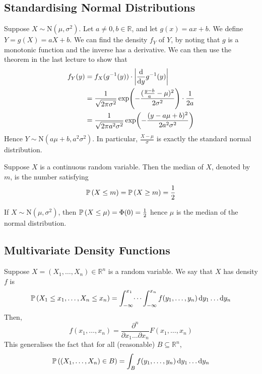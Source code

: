 \subsection{Standardising Normal Distributions}
Suppose \(X \sim \mathrm{N}(\mu, \sigma^2)\). Let \(a \neq 0, b \in \mathbb R\), and let \(g(x) = ax+b\). We define \(Y = g(X) = aX+b\). We can find the density \(f_Y\) of \(Y\), by noting that \(g\) is a monotonic function and the inverse has a derivative. We can then use the theorem in the last lecture to show that
\begin{align*}
	f_Y(y) & = f_X(g^{-1}(y)) \cdot \abs{\dv{y} g^{-1}(y)}                                                       \\
	       & = \frac{1}{\sqrt{2\pi\sigma^2}} \exp(-\frac{(\frac{y-b}{a} - \mu)^2}{2\sigma^2}) \cdot \frac{1}{2a} \\
	       & =\frac{1}{\sqrt{2\pi a^2\sigma^2}} \exp(-\frac{(y - a\mu + b)^2}{2 a^2 \sigma^2})
\end{align*}
Hence \(Y \sim \mathrm{N}(a \mu + b, a^2 \sigma^2)\). In particular, \(\frac{X-\mu}{\sigma}\) is exactly the standard normal distribution.
\begin{definition}
	Suppose \(X\) is a continuous random variable. Then the median of \(X\), denoted by \(m\), is the number satisfying
	\[ \mathbb{P}\left({X \leq m}\right) = \mathbb{P}\left({X \geq m}\right) = \frac{1}{2} \]
\end{definition}
\noindent If \(X \sim \mathrm{N}(\mu, \sigma^2)\), then \(\mathbb{P}\left({X \leq \mu}\right) = \Phi(0) = \frac{1}{2}\) hence \(\mu\) is the median of the normal distribution.

\subsection{Multivariate Density Functions}
Suppose \(X = (X_1, \dots, X_n) \in \mathbb R^n\) is a random variable. We say that \(X\) has density \(f\) is
\[ \mathbb{P}\left({X_1 \leq x_1, \dots, X_n \leq x_n}\right) = \int_{-\infty}^{x_1} \dots \int_{-\infty}^{x_n}  f(y_1, \dots, y_n) \dd{y_1} \dots \dd{y_n} \]
Then,
\[ f(x_1, \dots, x_n) = \frac{\partial^n}{\partial x_1 \dots \partial x_n} F(x_1, \dots, x_n) \]
This generalises the fact that for all (reasonable) \(B \subseteq \mathbb R^n\),
\[ \mathbb{P}\left({(X_1, \dots, X_n) \in B}\right) = \int_B f(y_1, \dots, y_n) \dd{y_1}\dots\dd{y_n} \]

